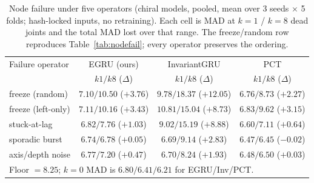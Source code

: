 \documentclass[10pt,journal]{IEEEtran}
\begin{document}
\begin{table}[!t]
\centering
\caption{Node failure under five operators (chiral models, pooled, mean over 3 seeds $\times$ 5 folds;
hash-locked inputs, no retraining). Each cell is MAD at $k\!=\!1$ / $k\!=\!8$ dead joints and the
total MAD lost over that range. The freeze/random row reproduces Table~\ref{tab:nodefail}; every
operator preserves the ordering.}
\label{tab:nodefail_modes}
\scriptsize
\setlength{\tabcolsep}{3pt}
\begin{tabular}{lccc}
\toprule
Failure operator & EGRU (ours) & InvariantGRU & PCT \\
 & \scriptsize $k1/k8$ ($\Delta$) & \scriptsize $k1/k8$ ($\Delta$) & \scriptsize $k1/k8$ ($\Delta$) \\
\midrule
freeze (random)      & $7.10/10.50$ ($+3.76$) & $9.78/18.37$ ($+12.05$) & $6.76/8.73$ ($+2.27$) \\
freeze (left-only)   & $7.11/10.16$ ($+3.43$) & $10.81/15.04$ ($+8.73$) & $6.83/9.62$ ($+3.15$) \\
stuck-at-lag         & $6.82/7.76$ ($+1.03$)  & $9.02/15.19$ ($+8.88$)  & $6.60/7.11$ ($+0.64$) \\
sporadic burst       & $6.74/6.78$ ($+0.05$)  & $6.69/9.14$ ($+2.83$)   & $6.47/6.45$ ($-0.02$) \\
axis/depth noise     & $6.77/7.20$ ($+0.47$)  & $6.70/8.24$ ($+1.93$)   & $6.48/6.50$ ($+0.03$) \\
\bottomrule
\multicolumn{4}{l}{\footnotesize Floor $=8.25$; $k\!=\!0$ MAD is $6.80/6.41/6.21$ for EGRU/Inv/PCT.} \\
\end{tabular}
\end{table}
\end{document}

